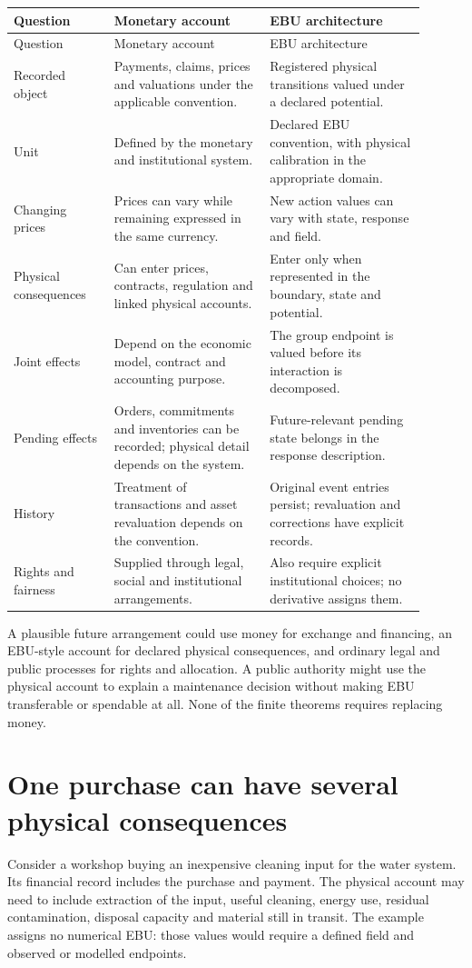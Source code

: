 \begingroup\small
\begin{longtable}{P{0.22\linewidth}P{0.34\linewidth}P{0.34\linewidth}}
\toprule
Question & Monetary account & EBU architecture\\\midrule
\endfirsthead
\toprule Question & Monetary account & EBU architecture\\\midrule
\endhead
Recorded object & Payments, claims, prices and valuations under the applicable convention. & Registered physical transitions valued under a declared potential.\\[5pt]
Unit & Defined by the monetary and institutional system. & Declared EBU convention, with physical calibration in the appropriate domain.\\[5pt]
Changing prices & Prices can vary while remaining expressed in the same currency. & New action values can vary with state, response and field.\\[5pt]
Physical consequences & Can enter prices, contracts, regulation and linked physical accounts. & Enter only when represented in the boundary, state and potential.\\[5pt]
Joint effects & Depend on the economic model, contract and accounting purpose. & The group endpoint is valued before its interaction is decomposed.\\[5pt]
Pending effects & Orders, commitments and inventories can be recorded; physical detail depends on the system. & Future-relevant pending state belongs in the response description.\\[5pt]
History & Treatment of transactions and asset revaluation depends on the convention. & Original event entries persist; revaluation and corrections have explicit records.\\[5pt]
Rights and fairness & Supplied through legal, social and institutional arrangements. & Also require explicit institutional choices; no derivative assigns them.\\
\bottomrule
\end{longtable}
\endgroup

A plausible future arrangement could use money for exchange and financing, an EBU-style account for declared physical consequences, and ordinary legal and public processes for rights and allocation. A public authority might use the physical account to explain a maintenance decision without making EBU transferable or spendable at all. None of the finite theorems requires replacing money.

\section{One purchase can have several physical consequences}
Consider a workshop buying an inexpensive cleaning input for the water system. Its financial record includes the purchase and payment. The physical account may need to include extraction of the input, useful cleaning, energy use, residual contamination, disposal capacity and material still in transit. The example assigns no numerical EBU: those values would require a defined field and observed or modelled endpoints.

